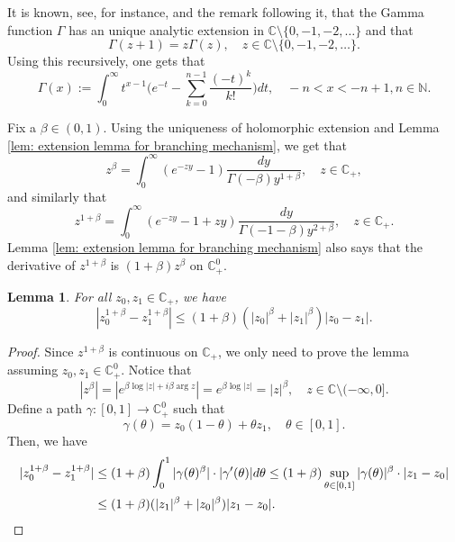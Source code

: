\documentclass[12pt,a4paper]{amsart}
\theoremstyle{plain}
\newtheorem{lem}[thm]{Lemma}
\theoremstyle{definition}
\numberwithin{equation}{section}
\begin{document}
It is known, see, for instance, \cite[Theorem 6.1.3]{SteinShakarchi2003Complex} and the remark following it, that the Gamma function $\Gamma$ has an unique analytic extension in $\mathbb C\setminus\{0, -1,-2,\dots\}$ and that
\[
	\Gamma(z+1) = z \Gamma(z),\quad z\in \mathbb C\setminus\{0, -1,-2,\dots\}.
\]
Using this recursively, one gets that
\begin{equation}
  \label{eq: definition of Gamma function}
  \Gamma(x)
  := \int_0^\infty t^{x-1} \Big(e^{-t} - \sum_{k=0}^{n-1} \frac{(-t)^k}{k!}\Big) dt,
  \quad -n< x< -n+1, n\in \mathbb N.
\end{equation}

Fix a $\beta \in (0,1)$.
Using the uniqueness of holomorphic extension and Lemma \ref{lem: extension lemma for branching mechanism}, we get that
\begin{equation}
  z^{\beta}
	= \int_0^\infty (e^{-zy}-1) \frac{dy}{\Gamma(-\beta)y^{1+\beta}},
  \quad z\in \mathbb C_+,
\end{equation}
and similarly that
\begin{equation}
  \label{eq: stable branching on C+}
  z^{1+\beta}
  = \int_0^\infty (e^{-zy}-1+zy)\frac{dy}{\Gamma(-1-\beta)y^{2+\beta}},
  \quad z\in \mathbb C_+.
\end{equation}
Lemma \ref{lem: extension lemma for branching mechanism} also says that the derivative of $z^{1+\beta}$ is $(1+\beta)z^{\beta}$ on $\mathbb C^0_+$.
\begin{lem}
  \label{lem: Lip of power function}
  For all $z_0,z_1 \in \mathbb C_+$, we have
\begin{equation}
  \label{eq: Lip of power function}
  |z_0^{1+\beta} - z_1^{1+\beta}|
  \leq (1+\beta)(|z_0|^{\beta}+|z_1|^{\beta})|z_0 - z_1|.
\end{equation}
\end{lem}
\begin{proof}
  Since $z^{1+\beta}$ is continuous on $\mathbb C_+$, we only need to prove the lemma assuming $z_0,z_1 \in \mathbb C^0_+$.
  Notice that
\begin{equation}
  \label{eq: upper bound for beta power of z}
	|z^\beta|
	= |e^{\beta \log |z| +i\beta \operatorname {arg}z}| = e^{\beta \log |z|} = |z|^\beta,
	\quad z \in \mathbb C\setminus (-\infty, 0].
\end{equation}
Define a path $\gamma: [0,1] \to \mathbb C^0_+$ such that
\[
  \gamma(\theta)
  = z_0 (1-\theta) + \theta z_1,
  \quad \theta \in [0,1].
\]
Then, we have
\begin{align}
  |z_0^{1+\beta} - z_1^{1+\beta}|
  & \leq (1+\beta) \int_0^1 |\gamma(\theta)^{\beta}|\cdot |\gamma'(\theta)|d\theta
    \leq (1+\beta)  \sup_{\theta \in [0,1]} |\gamma(\theta)|^{\beta} \cdot |z_1-z_0| \\
  & \leq (1+\beta)  ( |z_1|^{\beta}+|z_0|^{\beta} ) |z_1-z_0|.
    \qedhere
\end{align}
\end{proof}
\end{document}

